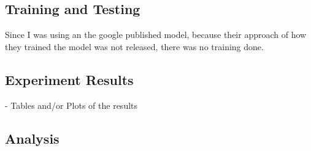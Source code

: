 \documentclass[12pt]{extarticle}
\begin{document}

\subsection{Training and Testing}
Since I was using an the google published model, because their approach of how they trained the model
was not released, there was no training done.

\subsection{Experiment Results}
- Tables and/or Plots of the results

\subsection{Analysis}






\end{document}

